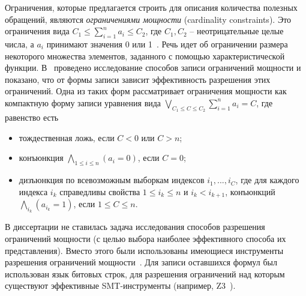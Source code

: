 \begin{enumerate}
Ограничения, которые предлагается строить для описания количества полезных обращений, являются \emph{ограничениями мощности} (cardinality constraints). Это
ограничения вида $C_1 \leqslant \sum_{i=1}^n a_i \leqslant C_2$, где $C_1, C_2$
-- неотрицательные целые числа, а $a_i$ принимают значения 0 или
1~\cite{smt_debugging, PiskacK08, KuncakR07,
Revesz05}. Речь идет об ограничении размера некоторого множества
элементов, заданного с помощью характеристической функции.
В~\cite{smt_debugging} проведено исследование способов записи
ограничений мощности и показано, что от формы записи зависит
эффективность разрешения этих ограничений. Одна из таких форм рассматривает ограничения
мощности как компактную форму записи уравнения
вида $\bigvee_{C_1 \leqslant C \leqslant C_2} \sum_{i=1}^n a_i = C$,
где равенство есть
\begin{itemize}
\item тождественная ложь, если $C < 0$ или $C > n$;
\item конъюнкция $\bigwedge_{1\leqslant i\leqslant n} (a_i = 0)$,
если $C = 0$;
\item дизъюнкция по всевозможным выборкам индексов $i_1, ..., i_C$, где
для каждого индекса $i_k$ справедливы свойства $1 \leqslant i_k
\leqslant n$ и $i_k < i_{k+1}$, конъюнкций $\bigwedge_{i_k} (a_{i_k}
= 1)$, если $1 \leqslant C \leqslant n$.
\end{itemize}

В диссертации не ставилась задача исследования способов разрешения ограничений
мощности (с целью выбора наиболее эффективного способа их представления). Вместо
этого были использованы
имеющиеся инструменты разрешения ограничений мощности~\cite{Z3, Yices}. Для
записи оставшихся формул был использован язык битовых строк, для разрешения
ограничений над которым существуют эффективные SMT-инструменты (например,
Z3~\cite{Z3}).


\end{enumerate}
